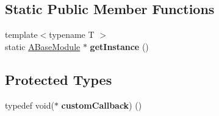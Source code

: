 \subsection*{Static Public Member Functions}
\begin{DoxyCompactItemize}
\item 
\mbox{\label{classwood_box_1_1module_1_1_a_base_module_a08ba1924981ed852924f7047f915986b}} 
{\footnotesize template$<$typename T $>$ }\\static \mbox{\hyperlink{classwood_box_1_1module_1_1_a_base_module}{A\+Base\+Module}} $\ast$ {\bfseries get\+Instance} ()
\end{DoxyCompactItemize}
\subsection*{Protected Types}
\begin{DoxyCompactItemize}
\item 
\mbox{\label{classwood_box_1_1module_1_1_a_base_module_ad5baa2bb35cc60ff4ed473724ec43b4e}} 
typedef void($\ast$ {\bfseries custom\+Callback}) ()
\end{DoxyCompactItemize}
